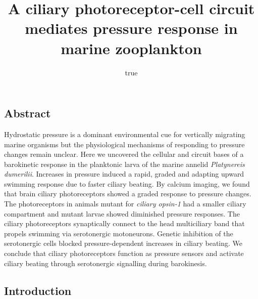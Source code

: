 \documentclass[
]{article}
\title{A ciliary photoreceptor-cell circuit mediates pressure response
in marine zooplankton}
\author{true}
\date{}
\begin{document}
\maketitle

\hypertarget{abstract}{%
\subsection{Abstract}\label{abstract}}

Hydrostatic pressure is a dominant environmental cue for vertically
migrating marine organisms but the physiological mechanisms of
responding to pressure changes remain unclear. Here we uncovered the
cellular and circuit bases of a barokinetic response in the planktonic
larva of the marine annelid \emph{Platynereis dumerilii}. Increases in
pressure induced a rapid, graded and adapting upward swimming response
due to faster ciliary beating. By calcium imaging, we found that brain
ciliary photoreceptors showed a graded response to pressure changes. The
photoreceptors in animals mutant for \emph{ciliary opsin-1} had a
smaller ciliary compartment and mutant larvae showed diminished pressure
responses. The ciliary photoreceptors synaptically connect to the head
multiciliary band that propels swimming via serotonergic motoneurons.
Genetic inhibition of the serotonergic cells blocked pressure-dependent
increases in ciliary beating. We conclude that ciliary photoreceptors
function as pressure sensors and activate ciliary beating through
serotonergic signalling during barokinesis.

\hypertarget{introduction}{%
\subsection{Introduction}\label{introduction}}
\end{document}
